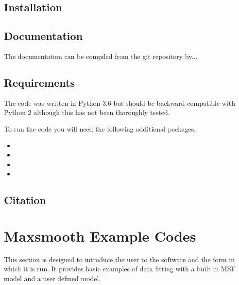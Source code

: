 \documentclass[letterpaper,10pt,english]{sphinxmanual}
\begin{document}
\section{Installation}
\label{\detokenize{source/intro:installation}}

\section{Documentation}
\label{\detokenize{source/intro:documentation}}
The documentation can be compiled from the git repository by...


\section{Requirements}
\label{\detokenize{source/intro:requirements}}
The code was written in Python 3.6 but should be backward compatible with
Python 2 although this has not been thoroughly tested.

To run the code you will need the following additional packages,
\begin{itemize}
\item {} 

\item {} 

\item {} 

\item {} 

\end{itemize}


\section{Citation}
\label{\detokenize{source/intro:citation}}

\chapter{Maxsmooth Example Codes}
\label{\detokenize{source/maxsmooth:maxsmooth-example-codes}}\label{\detokenize{source/maxsmooth::doc}}
This section is designed to introduce the user to the software and the form
in which it is run. It provides basic examples of data fitting with a built in
MSF model and a user defined model.
\end{document}

